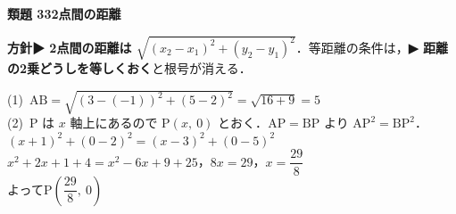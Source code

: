 \documentclass[a4paper,11pt]{ltjsarticle}
\newcommand{\ans}[2]{\Needspace{5\baselineskip}\vspace{6pt}%
  {\sffamily\bfseries 類題 #1\quad #2}\par}
\newcommand{\point}[1]{\textsf{\bfseries ▶ #1}}
\newcommand{\ax}[4]{\draw[->] (#1,0)--(#2,0) node[right]{\scriptsize $x$};
  \draw[->] (0,#3)--(0,#4) node[above]{\scriptsize $y$};
  \node[below left] at (0,0){\scriptsize O};}
\begin{document}
\ans{33}{2点間の距離}
\begin{kai}
\textbf{方針}\quad \point{2点間の距離は $\sqrt{(x_2-x_1)^2+(y_2-y_1)^2}$}．等距離の条件は，\point{距離の2乗どうしを等しくおく}と根号が消える．\\[2pt]
\begin{center}
\end{center}
(1)\ $\mathrm{AB}=\sqrt{(3-(-1))^2+(5-2)^2}=\sqrt{16+9}=5$\\[2pt]
(2)\ P は $x$ 軸上にあるので $\mathrm P(x,\ 0)$ とおく．$\mathrm{AP}=\mathrm{BP}$ より $\mathrm{AP}^2=\mathrm{BP}^2$．\\
\hspace*{1.5em}$(x+1)^2+(0-2)^2=(x-3)^2+(0-5)^2$\\
\hspace*{1.5em}$x^2+2x+1+4=x^2-6x+9+25$，\quad $8x=29$，\quad $x=\dfrac{29}8$\\
\hspace*{1.5em}よって\quad $\mathrm P\left(\dfrac{29}{8},\ 0\right)$
\end{kai}
\end{document}
